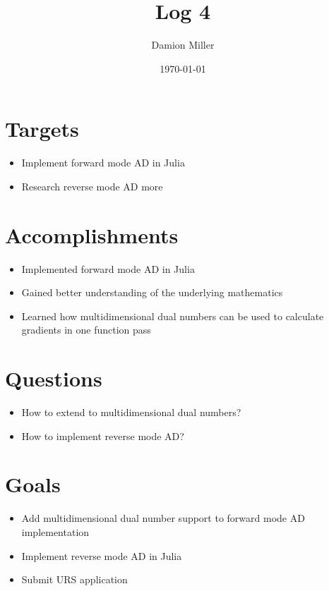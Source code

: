 \documentclass[12pt, letterpaper]{article}
\title{Log 4}
\author{Damion Miller}
\date{\today}
\begin{document}
\maketitle
\section*{Targets}
\begin{itemize}
\item Implement forward mode AD in Julia
\item Research reverse mode AD more
\end{itemize}

\section*{Accomplishments}
\begin{itemize}
\item Implemented forward mode AD in Julia 
\item Gained better understanding of the underlying mathematics
\item Learned how multidimensional dual numbers can be used to calculate gradients in one function pass
\end{itemize}

\section*{Questions}
\begin{itemize}
\item How to extend to multidimensional dual numbers?
\item How to implement reverse mode AD?
\end{itemize}

\section*{Goals}
\begin{itemize}
\item Add multidimensional dual number support to forward mode AD implementation
\item Implement reverse mode AD in Julia
\item Submit URS application 
\end{itemize}
\end{document}
